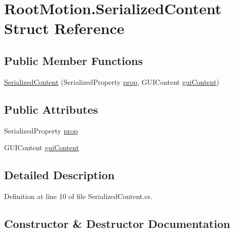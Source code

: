 \hypertarget{struct_root_motion_1_1_serialized_content}{}\section{Root\+Motion.\+Serialized\+Content Struct Reference}
\label{struct_root_motion_1_1_serialized_content}
\subsection*{Public Member Functions}
\begin{DoxyCompactItemize}
\item 
\mbox{\hyperlink{struct_root_motion_1_1_serialized_content_ad1ec11487c7dd78cbd0d3688ac615c09}{Serialized\+Content}} (Serialized\+Property \mbox{\hyperlink{struct_root_motion_1_1_serialized_content_a855f20bd650050d318b9b3b325ec46a3}{prop}}, G\+U\+I\+Content \mbox{\hyperlink{struct_root_motion_1_1_serialized_content_a545a76e14eca41d225310d8104de1b66}{gui\+Content}})
\end{DoxyCompactItemize}
\subsection*{Public Attributes}
\begin{DoxyCompactItemize}
\item 
Serialized\+Property \mbox{\hyperlink{struct_root_motion_1_1_serialized_content_a855f20bd650050d318b9b3b325ec46a3}{prop}}
\item 
G\+U\+I\+Content \mbox{\hyperlink{struct_root_motion_1_1_serialized_content_a545a76e14eca41d225310d8104de1b66}{gui\+Content}}
\end{DoxyCompactItemize}


\subsection{Detailed Description}


Definition at line 10 of file Serialized\+Content.\+cs.



\subsection{Constructor \& Destructor Documentation}
\mbox{\label{struct_root_motion_1_1_serialized_content_ad1ec11487c7dd78cbd0d3688ac615c09}} 
